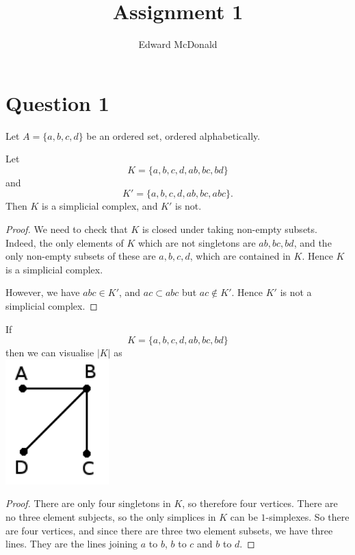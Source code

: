 \documentclass{unswmaths}
\begin{document}
\subject{Algebraic Topology}
\author{Edward McDonald}
\title{Assignment 1}

\newcommand{\Hilb}{\mathcal{H}}
\newcommand{\Proj}{\mathbf{P}}
\newcommand{\M}{\mathcal{M}}
\newcommand{\Dom}{\operatorname{Dom}}
\newcommand{\D}{\delta}
\newcommand{\Di}{\mathcal{D}}
\newcommand{\sgn}{\operatorname{sgn}}
\newcommand{\Ha}{\mathcal{H}}
\newcommand{\Span}{\operatorname{span}}
\newcommand{\im}{\operatorname{im}}

\setlength\parindent{0pt}

\unswtitle{}

\section*{Question 1}
Let $A = \{a,b,c,d\}$ be an ordered set, ordered alphabetically. 
\begin{proposition}
    Let 
    \begin{equation*}
        K = \{a,b,c,d,ab,bc,bd\}
    \end{equation*}
    and
    \begin{equation*}
        K' = \{a,b,c,d,ab,bc,abc\}.
    \end{equation*}
    Then $K$ is a simplicial complex, and $K'$ is not.
\end{proposition}
\begin{proof}
    We need to check that $K$ is closed under taking non-empty
    subsets. Indeed, the only elements of $K$ which are not singletons
    are $ab,bc,bd$, and the only non-empty subsets of these are $a,b,c,d$,
    which are contained in $K$. Hence $K$ is a simplicial complex.
    
    However, we have $abc \in K'$, and $ac \subset abc$ but $ac \notin K'$.
    Hence $K'$ is not a simplicial complex.
\end{proof}

\begin{proposition}
    If 
    \begin{equation*}
        K = \{a,b,c,d,ab,bc,bd\}
    \end{equation*}
    then we can visualise $|K|$ as\\
    \includegraphics[width=40mm]{polytope.png}
\end{proposition}
\begin{proof}
    There are only four singletons in $K$, so therefore four vertices.
    There are no three element subjects, so the only simplices in $K$
    can be $1$-simplexes. So there are four vertices, and since
    there are three two element subsets, we have three lines. They 
    are the lines joining $a$ to $b$, $b$ to $c$ and $b$ to $d$.
\end{proof}
\end{document}
